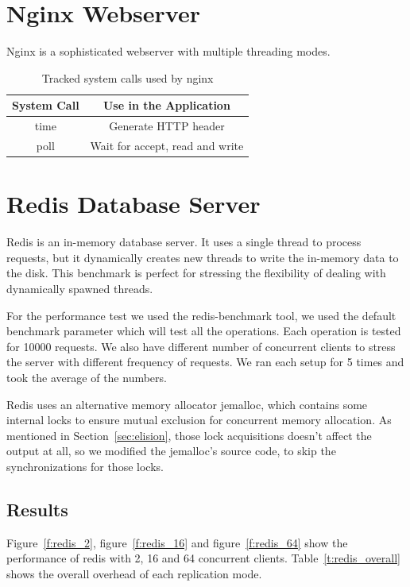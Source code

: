 \section{Nginx Webserver}
Nginx is a sophisticated webserver with multiple threading modes.

\begin{table}
\caption{Tracked system calls used by nginx}
\begin{center}
 \begin{tabular}{c | c }
System Call & Use in the Application\\ \hline
 time & Generate HTTP header\\ \hline
 poll & Wait for accept, read and write
 \end{tabular}
\end{center}
\label{t:nginx_syscall}
\end{table}

\section{Redis Database Server}
Redis is an in-memory database server. It uses a single thread to process requests, but it dynamically creates new threads to write the in-memory data to the disk. This benchmark is perfect for stressing the flexibility of dealing with dynamically spawned threads.

For the performance test we used the redis-benchmark tool, we used the default benchmark parameter which will test all the operations. Each operation is tested for 10000 requests. We also have different number of concurrent clients to stress the server with different frequency of requests. We ran each setup for 5 times and took the average of the numbers.

Redis uses an alternative memory allocator jemalloc, which contains some internal locks to ensure mutual exclusion for concurrent memory allocation. As mentioned in Section~\ref{sec:elision}, those lock acquisitions doesn't affect the output at all, so we modified the jemalloc's source code, to skip the synchronizations for those locks.

\subsection{Results}
Figure~\ref{f:redis_2}, figure~\ref{f:redis_16} and figure~\ref{f:redis_64} show the  performance of redis with 2, 16 and 64 concurrent clients. Table~\ref{t:redis_overall} shows the overall overhead of each replication mode. 

